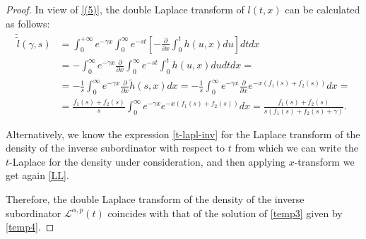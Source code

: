 \documentclass[10pt,a4paper]{amsart}
\begin{document}
\begin{proof}
		In view of \eqref{(5)}, the double Laplace transform of $l(t,x)$ can be calculated as follows:
		\begin{align}
			\tilde{\tilde{l}}(\gamma, s) &= \int_0^{+\infty} e^{-\gamma x} \int_0^\infty e^{-st} \left[ -\frac{\partial}{\partial x} \int_0^t h(u,x) du \right] dt dx \nonumber\\
			&= - \int_0^\infty e^{-\gamma x} \frac{\partial}{\partial x} \int_0^\infty e^{-st} \int_0^t h(u,x) du dt dx = \nonumber\\
			&= -\frac{1}{s} \int_0^\infty e^{-\gamma x} \frac{\partial}{\partial x} \tilde{h}(s,x) dx = -\frac{1}{s} \int_0^\infty e^{-\gamma x} \frac{\partial}{\partial x} e^{-x(f_1(s) + f_2(s))} dx = \nonumber\\
			&= \frac{f_1(s) + f_2(s)}{s} \int_0^\infty e^{-\gamma x} e^{-x(f_1(s) + f_2(s))} dx = \frac{f_1(s) + f_2(s)}{s(f_1(s) + f_2(s) + \gamma)}.\label{LL}
		\end{align}
		
		Alternatively, we know  the expression \eqref{t-lapl-inv} for the  Laplace transform of the density of the inverse subordinator with respect to $t$ from which we can write the $t$-Laplace for the density  under consideration, and then applying $x$-transform we  get again \eqref{LL}.
		
		Therefore, the double Laplace transform of the density of the inverse subordinator $\mathcal{L}^{\alpha, p}(t)$ coincides with that of the solution of \eqref{temp3} given by \eqref{temp4}.\end{proof}
\end{document}
